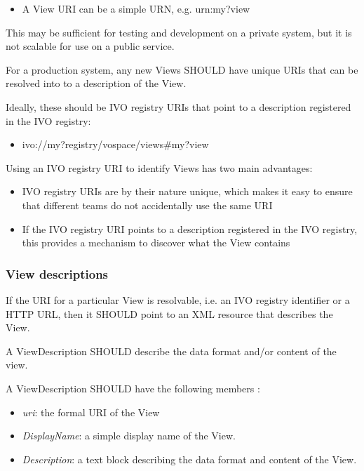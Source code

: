 \documentclass[11pt,a4paper]{ivoa}
\begin{document}
\begin{itemize}
    \item A View URI can be a simple URN, e.g. urn:my?view
\end{itemize}

This may be sufficient for testing and development on a private system, but it is not scalable for use on a public service.

For a production system, any new Views SHOULD have unique URIs that can be resolved into to a description of the View.

Ideally, these should be IVO registry URIs that point to a description registered in the IVO registry:

\begin{itemize}
    \item ivo://my?registry/vospace/views\#my?view
\end{itemize}

Using an IVO registry URI to identify Views has two main advantages:

\begin{itemize}
    \item IVO registry URIs are by their nature unique, which makes it easy to ensure that different teams do not accidentally use the same URI
    \item If the IVO registry URI points to a description registered in the IVO registry, this provides a mechanism to discover what the View contains
\end{itemize}

\subsubsection{View descriptions}
\label{subsubsec:view descriptions}
If the URI for a particular View is resolvable, i.e. an IVO registry identifier or a HTTP URL, then it SHOULD point to an XML resource that describes the View.

A ViewDescription SHOULD describe the data format and/or content of the view.

A ViewDescription SHOULD have the following members :

\begin{itemize}
    \item \emph{uri}: the formal URI of the View
    \item \emph{DisplayName}: a simple display name of the View.
    \item \emph{Description}: a text block describing the data format and content of the View.
\end{itemize}
\end{document}
